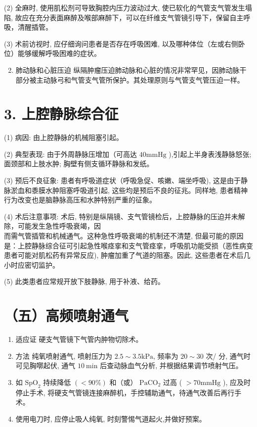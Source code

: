 \documentclass[10pt]{article}
\begin{document}
(2) 全麻时, 使用肌松剂可导致胸腔内压力波动过大, 使已软化的气管支气管发生塌陷, 故应在充分表面麻醉及喉部麻醉下，可以在纤维支气管镜引导下，保留自主呼吸，清醒插管。

(3) 术前访视时, 应仔细询问患者是否存在呼吸困难, 以及哪种体位（左或右侧卧位）能够缓解呼吸困难的症状。

\begin{enumerate}
  \setcounter{enumi}{1}
  \item 肺动脉和心脏压迫 纵隔肿瘤压迫肺动脉和心脏的情况非常罕见，因肺动脉干部分被主动脉弓和气管支气管所保护。其处理原则与气管支气管压迫一样。
\end{enumerate}

\section*{3. 上腔静脉综合征}
(1) 病因: 由上腔静脉的机械阻塞引起。

(2) 典型表现: 由于外周静脉压增加（可高达 $40 \mathrm{mmHg}$ ),引起上半身表浅静脉怒张; 面颈部和上肢水肿; 胸壁有侧支循环静脉和发纸。

(3) 预后不良征象: 患者有呼吸道症状（呼吸急促、咳嫩、端坐呼吸), 这是由于静脉淤血和黍膜水肿阻塞呼吸道引起, 这些均是预后不良的征兆。同样地, 患者精神行为改变也是脑静脉高压和水肿特别严重的征象。

(4) 术后注意事项: 术后, 特别是纵隔镜、支气管镜检后，上腔静脉的压迫并未解除，可能发生急性呼吸衰竭，因\\
而需气管插管和机械通气。这种急性呼吸衰竭的机制还不清楚, 但最可能的原因是：上腔静脉综合征可引起急性喉痉挛和支气管痉挛，呼吸肌功能受损（恶性病变患者可能对肌松药有异常反应), 肿瘤加重了气道的阻塞。因此, 这些患者在术后几小时应密切监护。

(5) 此类患者应常规开放下肢静脉, 用于补液、给药。

\section*{（五）高频喷射通气}
\begin{enumerate}
  \item 适应证 硬支气管镜下气管内肿物切除术。

  \item 方法 纯氧喷射通气, 喷射压力为 $2.5 \sim 3.5 \mathrm{kPa}$, 频率为 $20 \sim 30$ 次/ 分, 通气时可见胸㗥起伏, 通气 $10 \mathrm{~min}$ 后查动脉血气分析, 并根据结果调节喷射气压。

  \item 如 $\mathrm{SpO}_{2}$ 持续降低 $(<90 \%)$ 和（或） $\mathrm{PaCO}_{2}$ 过高 ( $>70 \mathrm{mmHg}$ ), 应及时停止手术, 将硬支气管镜连接麻醉机，手控辅助通气，待通气改善后再行手术。

  \item 使用电刀时, 应停止吸人纯氧, 时刻警惕气道起火,并做好预案。

\end{enumerate}
\end{document}
